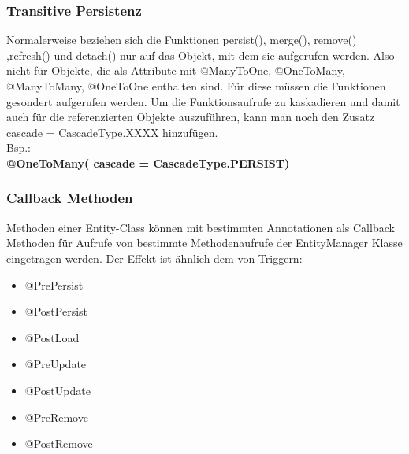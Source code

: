 \subsubsection{Transitive Persistenz}
Normalerweise beziehen sich die Funktionen persist(), merge(), remove() ,refresh() und detach() nur auf das Objekt, mit dem sie aufgerufen werden. Also nicht für Objekte, die als Attribute mit @ManyToOne, @OneToMany, @ManyToMany, @OneToOne enthalten sind. Für diese müssen die Funktionen gesondert aufgerufen werden. Um die Funktionsaufrufe zu kaskadieren und damit auch für die referenzierten Objekte auszuführen, kann man noch den Zusatz cascade = CascadeType.XXXX hinzufügen.\\
Bsp.:\\
\textbf{@OneToMany( cascade = CascadeType.PERSIST)}

\subsubsection{Callback Methoden}
Methoden einer Entity-Class können mit bestimmten Annotationen als Callback Methoden für Aufrufe von bestimmte Methodenaufrufe der EntityManager Klasse eingetragen werden. Der Effekt ist ähnlich dem von Triggern:
\begin{itemize}
    \item @PrePersist
    \item @PostPersist
    \item @PostLoad
    \item @PreUpdate
    \item @PostUpdate
    \item @PreRemove
    \item @PostRemove
\end{itemize}